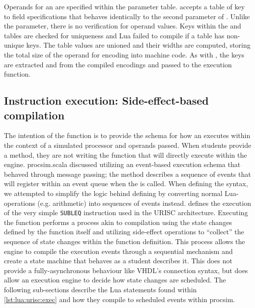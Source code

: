 Operands for an  are specified within the  parameter table.  accepts a table of key to field specifications that behaves identically to the second parameter of . Unlike the  parameter, there is no verification for operand values. Keys within the  and  tables are checked for uniqueness and Lua failed to compile if a table has non-unique keys. The table values are unioned and their widths are computed, storing the total size of the operand for encoding into machine code. As with , the keys are extracted and from the compiled encodings and passed to the execution function. 

\subsection{Instruction execution: Side-effect-based compilation}
\label{sec:lua:sec:instructions:sec:exec}

The intention of the  function is to provide the schema for how an  executes within the context of a simulated processor and operands passed. When students provide a  method, they are not writing the function that will directly execute within the engine. procsim.scala discussed utilizing an event-based execution schema that behaved through message passing; the  method describes a sequence of events that will register within an event queue when the  is called. When defining the syntax, we attempted to simplify the logic behind defining  by converting normal Lua-operations (e.g. arithmetic) into sequences of events instead.  defines the execution of the very simple \texttt{SUBLEQ} instruction used in the URISC architecture. Executing the  function performs a process akin to compilation using the state changes defined by the function itself and utilizing side-effect operations to ``collect'' the sequence of state changes within the function definition. This process allows the engine to compile the execution events through a sequential mechanism and create a state machine that behaves as a student describes it. This does not provide a fully-asynchronous behaviour like VHDL's connection syntax, but does allow an execution engine to decide how state changes are scheduled. The following sub-sections describe the Lua statements found within \cref{lst:lua:urisc:exec} and how they compile to scheduled events within procsim.  

